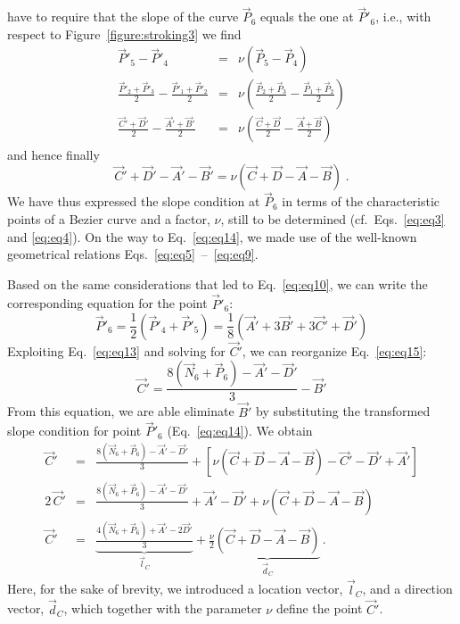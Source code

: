 have to require that the slope of the curve $\vec{P}_6$ equals the one at
$\vec{P}'_6$, i.e., with respect to Figure~\ref{figure:stroking3} we find
\begin{eqnarray*}
  \vec{P}'_5 - \vec{P}'_4 & = & \nu \left( \vec{P}_5 - \vec{P}_4 \right) \\ 
  \frac{\vec{P}'_2 + \vec{P}'_3}{2} -
  \frac{\vec{P}'_1 + \vec{P}'_2}{2} 
  & = & \nu \left(
  \frac{\vec{P}_2 + \vec{P}_3}{2} -
  \frac{\vec{P}_1 + \vec{P}_2}{2} \right) \\
  \frac{\vec{C}' + \vec{D}'}{2} - 
  \frac{\vec{A}' + \vec{B}'}{2} 
  & = & \nu \left(
  \frac{\vec{C} + \vec{D}}{2} - 
  \frac{\vec{A} + \vec{B}}{2} \right)
\end{eqnarray*}
and hence finally
\begin{equation}
  \label{eq:eq14}
  \vec{C}' + \vec{D}' - \vec{A}' - \vec{B}' = \nu \left(
  \vec{C} + \vec{D} - \vec{A} - \vec{B} \right)\;.
\end{equation}
We have thus expressed the slope condition at $\vec{P}_6$ in terms of the
characteristic points of a Bezier curve and a factor, $\nu$, still to be
determined (cf.~Eqs.~\ref{eq:eq3} and \ref{eq:eq4}). On the way to
Eq.~\ref{eq:eq14}, we made use of the well-known geometrical relations
\hbox{Eqs.~\ref{eq:eq5} -- \ref{eq:eq9}}. 

Based on the same considerations that led to Eq.~\ref{eq:eq10}, we can write
the corresponding equation for the point $\vec{P}'_6$:
\begin{equation}
  \label{eq:eq15}
  \vec{P}'_6 = \frac{1}{2} ( \vec{P}'_4 + \vec{P}'_5 ) 
  = \frac{1}{8} ( \vec{A}' + 3 \vec{B}' + 3 \vec{C}' + \vec{D}' ) 
\end{equation}
Exploiting Eq.~\ref{eq:eq13} and solving for $\vec{C}'$, we can reorganize
Eq.~\ref{eq:eq15}: 
\begin{equation}
  \label{eq:eq16}
  \vec{C}' = \frac{8 (\vec{N}_6 + \vec{P}_6) - \vec{A}' - \vec{D}'}{3} -
  \vec{B}'
\end{equation}
From this equation, we are able eliminate $\vec{B}'$ by substituting the
transformed slope condition for point $\vec{P}'_6$ (Eq.~\ref{eq:eq14}). We
obtain 
\begin{eqnarray}
  \nonumber
  \vec{C}' &=& \frac{8 (\vec{N}_6 + \vec{P}_6) - \vec{A}' - \vec{D}'}{3}
  + \left[ \nu \left( \vec{C} + \vec{D} - \vec{A} - \vec{B} \right)
  - \vec{C}' - \vec{D}' + \vec{A}' \right] \\ 
  \nonumber
  2\, \vec{C}' &=& \frac{8 (\vec{N}_6 + \vec{P}_6) - \vec{A}' - \vec{D}'}{3} 
  + \vec{A}' - \vec{D}' + 
  \nu \left( \vec{C} + \vec{D} - \vec{A} - \vec{B}\right) \\
  \label{eq:eq17}
  \vec{C}' &=& 
  \underbrace{\frac{4 (\vec{N}_6 + \vec{P}_6) + \vec{A}' - 2 \vec{D}'}{3}}
  _{\mbox{$\vec{l}_C$}}
  + \frac{\nu}{2} \underbrace{\left( \vec{C} + \vec{D} - \vec{A} -
  \vec{B}\right)}
  _{\mbox{$\vec{d}_C$}} \,.
\end{eqnarray}
Here, for the sake of brevity, we introduced a location vector, $\vec{l}_C$,
and a direction vector, $\vec{d}_C$, which together with the parameter $\nu$
define the point $\vec{C}'$. 


